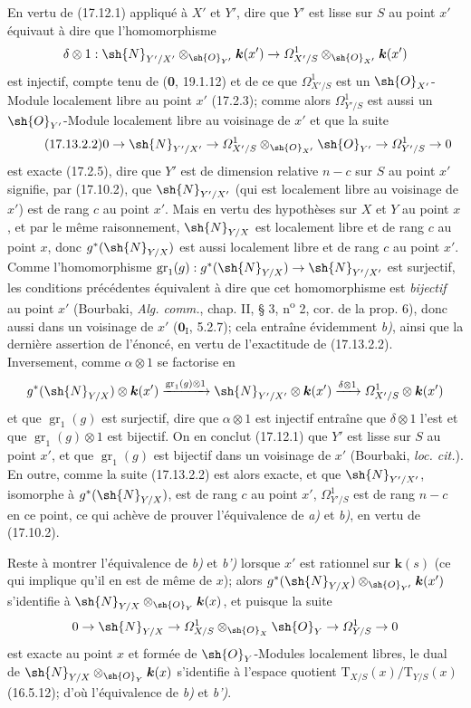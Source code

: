 En vertu de (17.12.1) appliqué à $X'$ et $Y'$, dire que $Y'$ est lisse sur $S$ au point $x'$ équivaut à dire que l'homomorphisme
\[
\delta\otimes1:\sh{N}_{Y'/X'}\otimes_{\sh{O}_{Y'}}\boldsymbol{k}(x')\to\varOmega^1_{X'/S}\otimes_{\sh{O}_{X'}}\boldsymbol{k}(x')
\]
est injectif, compte tenu de (\textbf{0}, 19.1.12) et de ce que $\varOmega^1_{X'/S}$ est un $\sh{O}_{X'}$-Module localement libre au point $x'$ (17.2.3); comme alors $\varOmega^1_{Y'/S}$ est aussi un $\sh{O}_{Y'}$-Module localement libre au voisinage de $x'$ et que la suite
\[
\label{IV.17.13.2.2}
\tag{17.13.2.2}
0\to\sh{N}_{Y'/X'}\to\varOmega^1_{X'/S}\otimes_{\sh{O}_{X'}}\sh{O}_{Y'}\to\varOmega^1_{Y'/S}\to0
\]
est exacte (17.2.5), dire que $Y'$ est de dimension relative $n-c$ sur $S$ au point $x'$ signifie, par (17.10.2), que $\sh{N}_{Y'/X'}$ (qui est localement libre au voisinage de $x'$) est de rang $c$ au point $x'$. Mais en vertu des hypothèses sur $X$ et $Y$ au point $x$, et par le même raisonnement, $\sh{N}_{Y/X}$ est localement libre et de rang $c$ au point $x$, donc $g^*(\sh{N}_{Y/X})$ est aussi localement libre et de rang $c$ au point $x'$. Comme l'homomorphisme $\operatorname{gr}_1(g):g^*(\sh{N}_{Y/X})\to\sh{N}_{Y'/X'}$ est surjectif, les conditions précédentes équivalent à dire que cet homomorphisme est
\emph{bijectif} au point $x'$ (Bourbaki, \emph{Alg. comm.}, chap. II, § 3, n\textsuperscript{o} 2, cor. de la prop. 6), donc aussi dans un voisinage de $x'$ ($\mathbf{0}_{\mathrm I}$, 5.2.7); cela entraîne évidemment \emph{b)}, ainsi que la dernière assertion de l'énoncé, en vertu de l'exactitude de (17.13.2.2). Inversement, comme $\alpha\otimes1$ se factorise en
\[
g^*(\sh{N}_{Y/X})\otimes\boldsymbol{k}(x')\xrightarrow{\operatorname{gr}_1(g)\otimes1}\sh{N}_{Y'/X'}\otimes\boldsymbol{k}(x')\xrightarrow{\delta\otimes1}\varOmega^1_{X'/S}\otimes\boldsymbol{k}(x')
\]
et que $\operatorname{gr}_1(g)$ est surjectif, dire que $\alpha\otimes1$ est injectif entraîne que $\delta\otimes1$ l'est et que $\operatorname{gr}_1(g)\otimes1$ est bijectif. On en conclut (17.12.1) que $Y'$ est lisse sur $S$ au point $x'$, et que $\operatorname{gr}_1(g)$ est bijectif dans un voisinage de $x'$ (Bourbaki, \emph{loc. cit.}). En outre, comme la suite (17.13.2.2) est alors exacte, et que $\sh{N}_{Y'/X'}$, isomorphe à $g^*(\sh{N}_{Y/X})$, est de rang $c$ au point $x'$, $\varOmega^1_{Y'/S}$ est de rang $n-c$ en ce point, ce qui achève de prouver l'équivalence de \emph{a)} et \emph{b)}, en vertu de (17.10.2).

Reste à montrer l'équivalence de \emph{b)} et \emph{b')} lorsque $x'$ est rationnel sur $\boldsymbol{k}(s)$ (ce qui implique qu'il en est de même de $x$); alors $g^*(\sh{N}_{Y/X})\otimes_{\sh{O}_{Y'}}\boldsymbol{k}(x')$ s'identifie à $\sh{N}_{Y/X}\otimes_{\sh{O}_Y}\boldsymbol{k}(x)$, et puisque la suite
\[
0\to\sh{N}_{Y/X}\to\varOmega^1_{X/S}\otimes_{\sh{O}_X}\sh{O}_Y\to\varOmega^1_{Y/S}\to0
\]
est exacte au point $x$ et formée de $\sh{O}_Y$-Modules localement libres, le dual de $\sh{N}_{Y/X}\otimes_{\sh{O}_Y}\boldsymbol{k}(x)$ s'identifie à l'espace quotient $\mathrm{T}_{X/S}(x)/\mathrm{T}_{Y/S}(x)$ (16.5.12); d'où l'équivalence de \emph{b)} et \emph{b')}.

